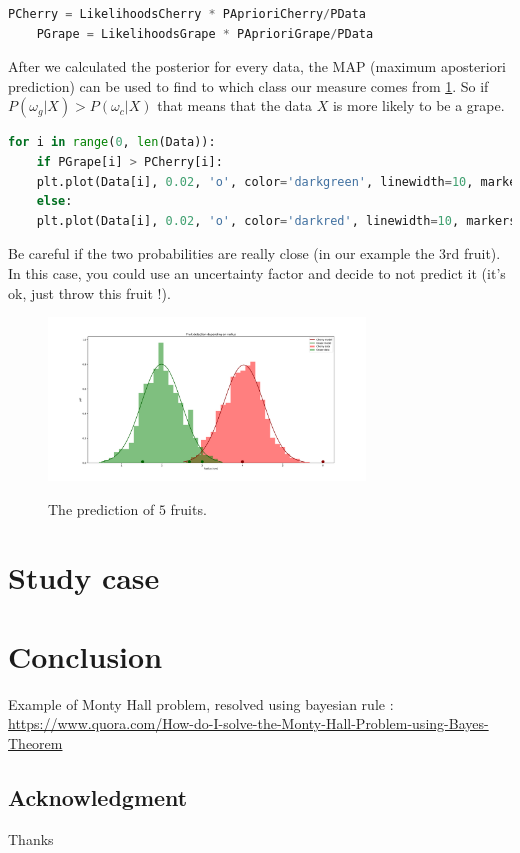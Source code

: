 \documentclass[runningheads,a4paper]{llncs}
\begin{document}
	\begin{lstlisting}[language=python]
	PCherry = LikelihoodsCherry * PAprioriCherry/PData
	PGrape = LikelihoodsGrape * PAprioriGrape/PData
	\end{lstlisting}
	
	After we calculated the posterior for every data, the MAP (maximum aposteriori prediction) can be used to find to which class our measure comes from \ref{fig:preds}. So if $P(\omega_g|X) > P(\omega_c|X)$  that means that the data $X$ is more likely to be a grape.
	
	\begin{lstlisting}[language=python]
	for i in range(0, len(Data)):
	if PGrape[i] > PCherry[i]:
	plt.plot(Data[i], 0.02, 'o', color='darkgreen', linewidth=10, markersize=12)
	else:
	plt.plot(Data[i], 0.02, 'o', color='darkred', linewidth=10, markersize=12)
	\end{lstlisting}
	
	Be careful if the two probabilities are really close (in our example the 3rd fruit). In this case, you could use an uncertainty factor and decide to not predict it (it's ok, just throw this fruit !).
	
	\begin{figure}
	\centering
	\includegraphics[width=0.75\textwidth]{Figures/preds}
	\\ \parbox{0.75\textwidth}{\caption[Distribution]{The prediction of $5$ fruits.}\label{fig:preds}} 
	\end{figure}
	
	
	
	\section{Study case}
	\label{sec:method}
	
	\section{Conclusion}
	\label{sec:conclusion}
	Example of Monty Hall problem, resolved using bayesian rule :
	\url{https://www.quora.com/How-do-I-solve-the-Monty-Hall-Problem-using-Bayes-Theorem}
	 
	\subsection*{Acknowledgment}
	Thanks
	
	{\small
		
		
	}
	
\end{document}
